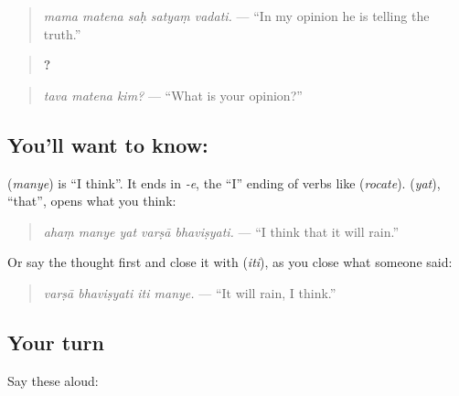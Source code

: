 \begin{quote}
\textbf{    }
\end{quote}

\begin{quote}
\emph{mama matena saḥ satyaṃ vadati.} — \textquotedblleft{}In my opinion he is telling the truth.\textquotedblright{}
\end{quote}

\begin{quote}
\textbf{  ?}
\end{quote}

\begin{quote}
\emph{tava matena kim?} — \textquotedblleft{}What is your opinion?\textquotedblright{}
\end{quote}

\subsection*{You'll want to know:  }
\textbf{} (\emph{manye}) is \textquotedblleft{}I think\textquotedblright{}. It ends in \emph{-e}, the \textquotedblleft{}I\textquotedblright{} ending of verbs like \textbf{} (\emph{rocate}). \textbf{} (\emph{yat}), \textquotedblleft{}that\textquotedblright{}, opens what you think:

\begin{quote}
\textbf{    }
\end{quote}

\begin{quote}
\emph{ahaṃ manye yat varṣā bhaviṣyati.} — \textquotedblleft{}I think that it will rain.\textquotedblright{}
\end{quote}

Or say the thought first and close it with \textbf{} (\emph{iti}), as you close what someone said:

\begin{quote}
\textbf{   }
\end{quote}

\begin{quote}
\emph{varṣā bhaviṣyati iti manye.} — \textquotedblleft{}It will rain, I think.\textquotedblright{}
\end{quote}

\subsection*{Your turn}
Say these aloud:

